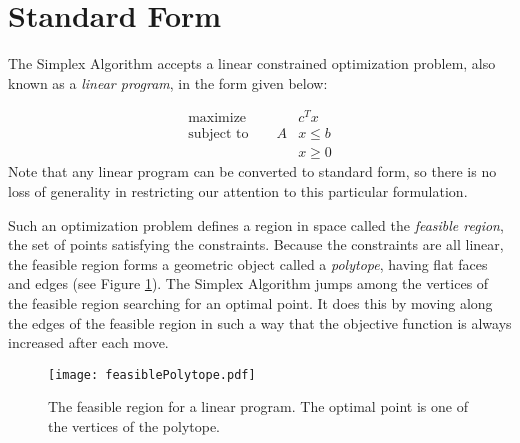 \label{lab:Simplex}


\section*{Standard Form} %

The Simplex Algorithm accepts a linear constrained optimization problem, also known as a \emph{linear program},
in the form given below:

\begin{align*}
\text{maximize}\qquad &c^Tx \\
\text{subject to}\qquad A&x \leq b \\
 &x \geq 0
\end{align*}
Note that any linear program can be converted to standard form, so there is no loss of
generality in restricting our attention to this particular formulation.

Such an optimization problem defines a region in space called the \emph{feasible region}, the set of points
satisfying the constraints. Because the constraints are all linear, the feasible region forms a geometric object
called a \emph{polytope}, having flat faces and edges (see Figure \ref{fig:polytope}).
The Simplex Algorithm jumps among the vertices of the feasible region searching for an optimal point.
It does this by moving along the edges of the feasible region in such a way that the objective function
is always increased after each move.

\begin{figure}
\centering
\texttt{[image: feasiblePolytope.pdf]}
\caption{The feasible region for a linear program. The optimal point
is one of the vertices of the polytope.}
\label{fig:polytope}
\end{figure}

